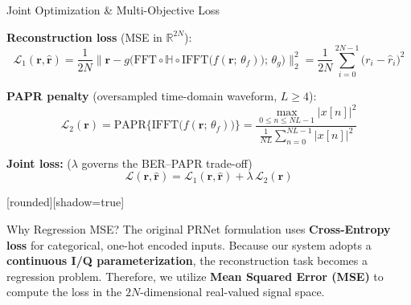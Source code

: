 \documentclass[20pt]{beamer}
\begin{document}
\begin{frame}[t]{Joint Optimization \& Multi-Objective Loss}

    \fontsize{13}{17}\selectfont
    \setlength{\abovedisplayskip}{3pt}
    \setlength{\belowdisplayskip}{3pt}
    \setlength{\parskip}{1pt}
    \vspace*{1.8in}

    \textbf{Reconstruction loss} (MSE in $\mathbb{R}^{2N}$):
    \begin{equation*}
        \mathcal{L}_1(\bm{r},\hat{\bm{r}})
        = \frac{1}{2N}\bigl\|\bm{r} - g\bigl(\mathrm{FFT} \circ \mathbb{H} \circ \mathrm{IFFT}\bigl(f(\bm{r};\,\theta_f)\bigr);\,\theta_g\bigr)\bigr\|_2^2
        = \frac{1}{2N}\sum_{i=0}^{2N-1}\bigl(r_i - \hat{r}_i\bigr)^2
    \end{equation*}

    \textbf{PAPR penalty} (oversampled time-domain waveform, $L \ge 4$):
    \begin{equation*}
        \mathcal{L}_2(\bm{r})
        = \mathrm{PAPR}\bigl\{\mathrm{IFFT}\bigl(f(\bm{r};\,\theta_f)\bigr)\bigr\}
        = \frac{\displaystyle\max_{0 \le n \le NL-1} |x[n]|^2}
        {\displaystyle\frac{1}{NL}\sum_{n=0}^{NL-1}|x[n]|^2}
    \end{equation*}

    \textbf{Joint loss:} ($\lambda$ governs the BER--PAPR trade-off)
    \begin{equation*}
        \mathcal{L}(\bm{r},\hat{\bm{r}}) = \mathcal{L}_1(\bm{r},\hat{\bm{r}}) + \lambda\,\mathcal{L}_2(\bm{r})
    \end{equation*}

    \vspace{0.15in}
    [rounded][shadow=true]
    \begin{block}{Why Regression MSE?}
        The original PRNet formulation uses \textbf{Cross-Entropy loss} for categorical, one-hot encoded inputs. Because our system adopts a \textbf{continuous I/Q parameterization}, the reconstruction task becomes a regression problem. Therefore, we utilize \textbf{Mean Squared Error (MSE)} to compute the loss in the $2N$-dimensional real-valued signal space.
    \end{block}

\end{frame}
\end{document}
